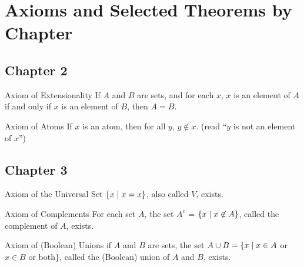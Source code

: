 \def\fThmEtc{\fontseries{m}\fontshape{n}\normalsize
\selectfont}
\appendix
\def\thechapter{}

\chapter[Appendix: Selected Axioms and Theorems]{Axioms and Selected Theorems
by\\ Chapter}

\section *{Chapter 2}

\begin{axiom}{Axiom of Extensionality}
 If $A$ and $B$ are sets, and for each $x$, $x$ is an
 element of $A$ if and only if $x$ is an element of $B$, then $A = B$.
\end{axiom}

\begin{axiom}{Axiom of Atoms}
 If $x$ is an atom, then for all $y$, $y
 \not\in x$. (read ``$y$ is not an element of $x$'')
\end{axiom}



\section *{Chapter 3}

\begin{axiom}{Axiom of the Universal Set}
 $\{x \mid x = x\}$, also called $V$, exists.
\end{axiom}

\begin{axiom}{Axiom of Complements}
 For each set $A$, the
 set $A^c$ = $\{x \mid x \not\in A\}$, called the {\upshape complement}
 of $A$, exists.
\end{axiom}

\begin{axiom}{Axiom of (Boolean)
Unions}
 if $A$ and $B$ are sets, the set $A \cup B = 
 \{x \mid x \in A$ or $x \in B$ or both$\}$, called the
 (Boolean) {\upshape union} of $A$ and $B$, exists.
\end{axiom}

